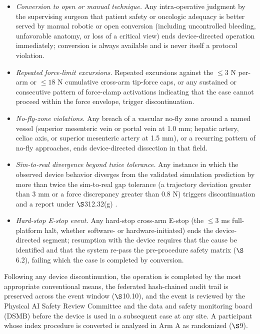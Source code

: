 \begin{itemize}[leftmargin=1.4em,itemsep=1pt,topsep=2pt]
\item \textit{Conversion to open or manual technique.} Any intra-operative judgment
by the supervising surgeon that patient safety or oncologic adequacy is better
served by manual robotic or open conversion (including uncontrolled bleeding,
unfavorable anatomy, or loss of a critical view) ends device-directed operation
immediately; conversion is always available and is never itself a protocol
violation.
\item \textit{Repeated force-limit excursions.} Repeated excursions against the
$\leq 3$ N per-arm or $\leq 18$ N cumulative cross-arm tip-force caps, or any
sustained or consecutive pattern of force-clamp activations indicating that the
case cannot proceed within the force envelope, trigger discontinuation.
\item \textit{No-fly-zone violations.} Any breach of a vascular no-fly zone around a
named vessel (superior mesenteric vein or portal vein at 1.0 mm; hepatic artery,
celiac axis, or superior mesenteric artery at 1.5 mm), or a recurring pattern of
no-fly approaches, ends device-directed dissection in that field.
\item \textit{Sim-to-real divergence beyond twice tolerance.} Any instance in which
the observed device behavior diverges from the validated simulation prediction by
more than twice the sim-to-real gap tolerance (a trajectory deviation greater than
3 mm or a force discrepancy greater than 0.8 N) triggers discontinuation and a
report under $\S$312.32(g) \cite{kawchak2026adapt312}.
\item \textit{Hard-stop E-stop event.} Any hard-stop cross-arm E-stop (the
$\leq 3$ ms full-platform halt, whether software- or hardware-initiated) ends the
device-directed segment; resumption with the device requires that the cause be
identified and that the system re-pass the pre-procedure safety matrix
($\S$6.2), failing which the case is completed by conversion.
\end{itemize}

Following any device discontinuation, the operation is completed by the most
appropriate conventional means, the federated hash-chained audit trail is preserved
across the event window ($\S$10.10), and the event is reviewed by the Physical AI
Safety Review Committee and the data and safety monitoring board (DSMB) before the
device is used in a subsequent case at any site. A participant whose index procedure
is converted is analyzed in Arm A as randomized ($\S$9).

